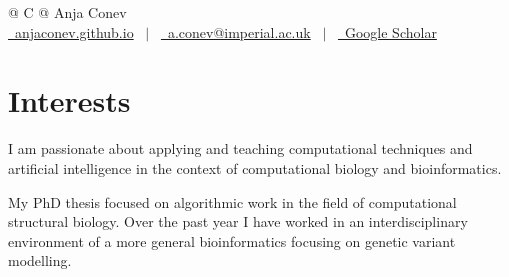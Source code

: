 \documentclass[a4paper,12pt]{article}
\begin{document}
\pagestyle{empty} 



\begin{tabularx}{\linewidth}{@{} C @{}}
\Huge{Anja Conev} \\[7.5pt]
\href{https://anjaconev.github.io/about/}{\raisebox{-0.05\height}\faGlobe \ anjaconev.github.io} \ $|$ \ 
\href{mailto:a.conev@imperial.ac.uk}{\raisebox{-0.05\height}\faEnvelope \ a.conev@imperial.ac.uk} \ $|$ \ 
\href{https://scholar.google.com/citations?user=NYWrBvYAAAAJ}{\raisebox{-0.05\height}\faGraduationCap\ Google Scholar}
\end{tabularx}


\section{Interests}

I am passionate about applying and teaching computational techniques and artificial intelligence  
in the context of computational biology and bioinformatics. 

My PhD thesis focused on algorithmic work 
in the field of computational structural biology. Over the past year I have worked in an 
interdisciplinary environment of a more general bioinformatics focusing on genetic variant modelling.
\end{document}
